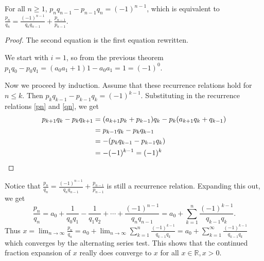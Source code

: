 \documentclass{ximera}
\begin{document}
\begin{theorem}
 For all $n\geq 1$, $p_nq_{n-1}-p_{n-1}q_n=(-1)^{n-1}$, which is equivalent to $\frac{p_n}{q_n}=\frac{(-1)^{n-1}}{q_nq_{n-1}}+\frac{p_{n-1}}{p_{n-1}}$.
\end{theorem}
\begin{proof}
The second equation is the first equation rewritten.

 We start with $i=1$, so from the previous theorem $p_1q_0-p_0q_1=(a_0a_1+1)1-a_0a_1=1=(-1)^0$.
 
 Now we proceed by induction. Assume that these recurrence relations hold for $n\leq k$. Then $p_kq_{k-1}-p_{k-1}q_k=(-1)^{k-1}$.
 Substituting in the recurrence relations  \eqref{pn} and \eqref{qn}, we get 
\begin{align*}
 p_{k+1}q_{k}-p_{k}q_{k+1}&=(a_{k+1}p_k+p_{k-1})q_k-p_k(a_{k+1}q_k +q_{k-1})\\
 &=p_{k-1}q_k-p_kq_{k-1}\\
 &=-(p_kq_{k-1}-p_{k-1}q_k)\\
 &=-(-1)^{k-1}=(-1)^k\qedhere
\end{align*}
\end{proof}

Notice that $\frac{p_n}{q_n}=\frac{(-1)^{n-1}}{q_nq_{n-1}}+\frac{p_{n-1}}{p_{n-1}}$ is still a recurrence relation. Expanding this out, we get \[\frac{p_n}{q_n}=a_0+\frac{1}{q_0q_1}-\frac{1}{q_1q_2}+\cdots+\frac{(-1)^{n-1}}{q_nq_{n-1}}=a_0+\sum_{k=1}^n\frac{(-1)^{k-1}}{q_{k-1}q_k}.\] Thus $x=\lim_{n\to\infty}\frac{p_n}{q_n}=a_0+\lim_{n\to\infty}\sum_{k=1}^n\frac{(-1)^{k-1}}{q_{k-1}q_k}=a_0+\sum_{k=1}^\infty\frac{(-1)^{k-1}}{q_{k-1}q_k}$ which converges by the alternating series test. This shows that the continued fraction expansion of $x$ really does converge to $x$ for all $x\in\mathbb{R},x>0.$
\end{document}
